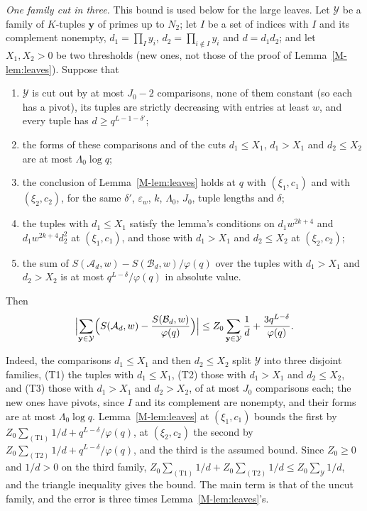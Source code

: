 \documentclass[11pt]{article}
\numberwithin{equation}{section}
\begin{document}
\emph{One family cut in three.} This bound is used below for the large leaves. Let $\mathcal Y$ be a
family of $K$-tuples $\mathbf y$ of primes up to $N_2$; let $I$ be a set of indices with $I$ and its complement
nonempty, $d_1 = \prod_I y_i$, $d_2 = \prod_{i \notin I} y_i$ and $d = d_1 d_2$; and let $X_1, X_2 > 0$ be two
thresholds (new ones, not those of the proof of Lemma~\ref{M-lem:leaves}). Suppose that
\begin{enumerate}
\item[(Y1)] $\mathcal Y$ is cut out by at most $J_0 - 2$ comparisons, none of them constant (so each has a pivot), its
  tuples are strictly decreasing with entries at least $w$, and every tuple has $d \ge q^{L - 1 - \delta'}$;
\item[(Y2)] the forms of these comparisons and of the cuts $d_1 \le X_1$, $d_1 > X_1$ and $d_2 \le X_2$ are at most
  $\Lambda_0 \log q$;
\item[(Y3)] the conclusion of Lemma~\ref{M-lem:leaves} holds at $q$ with $(\xi_1, c_1)$ and with $(\xi_2, c_2)$, for
  the same $\delta'$, $\varepsilon_w$, $k$, $\Lambda_0$, $J_0$, tuple lengths and $\delta$;
\item[(Y4)] the tuples with $d_1 \le X_1$ satisfy the lemma's conditions on $d_1 w^{2k + 4}$ and $d_1 w^{2k + 4} d_2^2$
  at $(\xi_1, c_1)$, and those with $d_1 > X_1$ and $d_2 \le X_2$ at $(\xi_2, c_2)$;
\item[(Y5)] the sum of $S(\mathcal A_d, w) - S(\mathcal B_d, w)/\varphi(q)$ over the tuples with $d_1 > X_1$ and $d_2 >
  X_2$ is at most $q^{L - \delta}/\varphi(q)$ in absolute value.
\end{enumerate}
Then
\[
  \Bigl|\sum_{\mathbf y \in \mathcal Y} \Bigl(S(\mathcal A_d, w) - \frac{S(\mathcal B_d, w)}{\varphi(q)}\Bigr)\Bigr|
  \le Z_0 \sum_{\mathbf y \in \mathcal Y} \frac1d + \frac{3q^{L - \delta}}{\varphi(q)}.
\]

Indeed, the comparisons $d_1 \le X_1$ and then $d_2 \le X_2$ split $\mathcal Y$ into three disjoint families, (T1) the
tuples with $d_1 \le X_1$, (T2) those with $d_1 > X_1$ and $d_2 \le X_2$, and (T3) those with $d_1 > X_1$ and $d_2 >
X_2$, of at most $J_0$ comparisons each; the new ones have pivots, since $I$ and its complement are nonempty, and their
forms are at
most $\Lambda_0 \log q$. Lemma~\ref{M-lem:leaves} at $(\xi_1, c_1)$ bounds the first by $Z_0 \sum_{(\mathrm{T1})} 1/d +
q^{L -
\delta}/\varphi(q)$, at $(\xi_2, c_2)$ the second by $Z_0 \sum_{(\mathrm{T2})} 1/d + q^{L - \delta}/\varphi(q)$, and the
third is
the assumed bound. Since $Z_0 \ge 0$ and $1/d > 0$ on the third family, $Z_0\sum_{(\mathrm{T1})} 1/d +
Z_0\sum_{(\mathrm{T2})} 1/d \le Z_0
\sum_{\mathcal Y} 1/d$, and the triangle inequality gives the bound. The main term is that of the uncut family, and the
error is three times Lemma~\ref{M-lem:leaves}'s.
\end{document}
